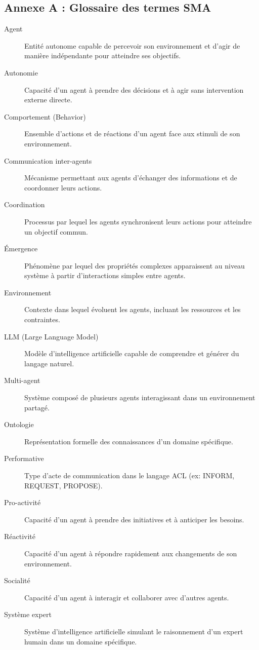 \subsection{Annexe A : Glossaire des termes SMA}

\begin{description}
    \item[Agent] Entité autonome capable de percevoir son environnement et d'agir de manière indépendante pour atteindre ses objectifs.

    \item[Autonomie] Capacité d'un agent à prendre des décisions et à agir sans intervention externe directe.

    \item[Comportement (Behavior)] Ensemble d'actions et de réactions d'un agent face aux stimuli de son environnement.

    \item[Communication inter-agents] Mécanisme permettant aux agents d'échanger des informations et de coordonner leurs actions.

    \item[Coordination] Processus par lequel les agents synchronisent leurs actions pour atteindre un objectif commun.

    \item[Émergence] Phénomène par lequel des propriétés complexes apparaissent au niveau système à partir d'interactions simples entre agents.

    \item[Environnement] Contexte dans lequel évoluent les agents, incluant les ressources et les contraintes.

    \item[LLM (Large Language Model)] Modèle d'intelligence artificielle capable de comprendre et générer du langage naturel.

    \item[Multi-agent] Système composé de plusieurs agents interagissant dans un environnement partagé.

    \item[Ontologie] Représentation formelle des connaissances d'un domaine spécifique.

    \item[Performative] Type d'acte de communication dans le langage ACL (ex: INFORM, REQUEST, PROPOSE).

    \item[Pro-activité] Capacité d'un agent à prendre des initiatives et à anticiper les besoins.

    \item[Réactivité] Capacité d'un agent à répondre rapidement aux changements de son environnement.

    \item[Socialité] Capacité d'un agent à interagir et collaborer avec d'autres agents.

    \item[Système expert] Système d'intelligence artificielle simulant le raisonnement d'un expert humain dans un domaine spécifique.
\end{description}

